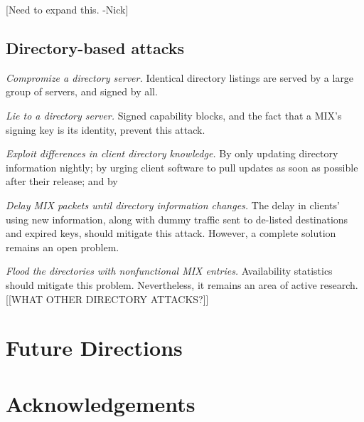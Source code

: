 \documentclass{llncs}
\begin{document}
[Need to expand this. -Nick]

\subsection{Directory-based attacks}
\label{subsec:attacks-dirbased}

\begin{description}
\item \emph{Compromize a directory server.} Identical directory listings
  are served by a large group of servers, and signed by all.
\item \emph{Lie to a directory server.}  Signed capability blocks, and
  the fact that a MIX's signing key is its identity, prevent this
  attack.
\item \emph{Exploit differences in client directory knowledge.}  By
  only updating directory information nightly; by urging client
  software to pull updates as soon as possible after their release;
  and by 
\item \emph{Delay MIX packets until directory information changes.}
  The delay in clients' using new information, along with dummy
  traffic sent to de-listed destinations and expired keys, should
  mitigate this attack. However, a complete solution remains an
  open problem.
\item \emph{Flood the directories with nonfunctional MIX entries.}
  Availability statistics should mitigate this problem.  Nevertheless,
  it remains an area of active research. \cite{mix-acc,casc-rep}
[[WHAT OTHER DIRECTORY ATTACKS?]]
\end{description}


\section{Future Directions}
\label{sec:conclusion}


\section*{Acknowledgements}





\end{document}
